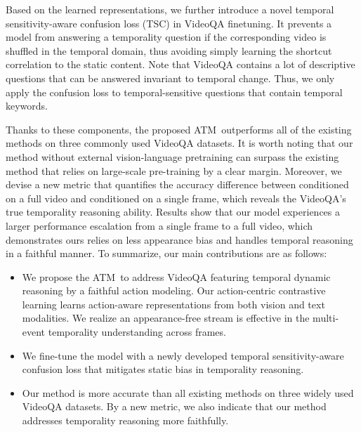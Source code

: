 \documentclass[sigconf]{acmart}
\newcommand{\methodname}{ATM~}
\begin{document}
Based on the learned representations, we further introduce a novel temporal sensitivity-aware confusion loss (TSC) in VideoQA finetuning.
It prevents a model from answering a temporality question if the corresponding video is shuffled in the temporal domain, thus avoiding simply learning the shortcut correlation to the static content.
Note that VideoQA contains a lot of descriptive questions that can be answered invariant to temporal change. Thus, we only apply the confusion loss to temporal-sensitive questions that contain temporal keywords. 










Thanks to these components, the proposed \methodname outperforms all of the existing methods on three commonly used VideoQA datasets. It is worth noting that our method without external vision-language pretraining can surpass the existing method that relies on large-scale pre-training by a clear margin.
Moreover, we devise a new metric that quantifies the accuracy difference between conditioned on a full video and conditioned on a single frame, which reveals the VideoQA's true temporality reasoning ability.
Results show that our model experiences a larger performance escalation from a single frame to a full video, which demonstrates ours relies on less appearance bias and handles temporal reasoning in a faithful manner.
To summarize, our main contributions are as follows:
\begin{itemize}
\vspace{-1mm}
    \item We propose the \methodname to address VideoQA featuring temporal dynamic reasoning by a faithful action modeling. Our action-centric contrastive learning learns action-aware representations from both vision and text modalities. We realize an appearance-free stream is effective in the multi-event temporality understanding across frames. 
\item  We fine-tune the model with a newly developed temporal sensitivity-aware confusion loss that mitigates static bias in temporality reasoning.
\vspace{-1mm}	
 \item Our method is more accurate than all existing methods on three widely used VideoQA datasets. By a new metric, we also indicate that our method addresses temporality reasoning more faithfully.  
\end{itemize}
\end{document}
